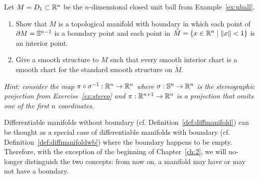 \begin{exercise}
  Let $M = D_1\subset \mathbb{R}^n$ be the $n$-dimensional closed unit ball from Example~\ref{ex:uball}.
  \begin{enumerate}
    \item Show that $M$ is a topological manifold with boundary in which each point of $\partial M = \mathbb{S}^{n-1}$ is a boundary point and each point in $\mathring M = \{x\in\mathbb{R}^n\mid\|x\|<1\}$ is an interior point.
    \item Give a smooth structure to $M$ such that every smooth interior chart is a smooth chart for the standard smooth structure on $\mathring M$.
  \end{enumerate}
  \textit{\small Hint: consider the map $\pi\circ\sigma^{-1}:\mathbb{R}^n\to\mathbb{R}^n$ where $\sigma:\mathbb{S}^n\to\mathbb{R}^n$ is the stereographic projection from Exercise~\ref{ex:stereo} and $\pi:\mathbb{R}^{n+1}\to\mathbb{R}^n$ is a projection that omits one of the first $n$ coordinates.}
\end{exercise}

\begin{tcolorbox}
  Differentiable manifolds without boundary (cf. Definition~\ref{def:diffmanifold}) can be thought as a special case of differentiable manifolds with boundary (cf. Definition~\ref{def:diffmanifoldwb}) where the boundary happens to be empty.
  Therefore, with the exception of the beginning of Chapter~\ref{ch:2}, we will no-longer distinguish the two concepts: from now on, a manifold may have or may not have a boundary.
\end{tcolorbox}
